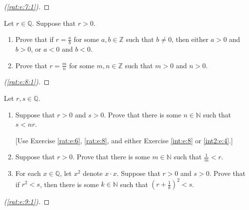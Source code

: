 \begin{proof}[(\ref{rat:e:7:1})]
	\TBD
\end{proof}



\Newpage
\begin{exercise} %
	\label{rat:e:8}
	Let $r \in \mathbb{Q}$. Suppose that $r > 0$.
	\begin{enumerate}
		\item Prove that if $r = \frac{a}{b}$ for some $a, b \in \mathbb{Z}$ such that $b \neq 0$, then either $a > 0$ and $b > 0$, or $a < 0$ and $b < 0$. \label{rat:e:8:1}
		\item Prove that $r = \frac{m}{n}$ for some $m, n \in \mathbb{Z}$ such that $m > 0$ and $n > 0$. \label{rat:e:8:2}
	\end{enumerate}
\end{exercise}

\begin{proof}[(\ref{rat:e:8:1})]
	\TBD
\end{proof}



\Newpage
\begin{exercise} %
	\label{rat:e:9}
	Let $r, s \in \mathbb{Q}$.
	\begin{enumerate}
		\item \label{rat:e:9:1}
		      Suppose that $r > 0$ and $s > 0$. Prove that there is some $n \in \mathbb{N}$ such that $s < n r$.

		      \hfill[Use Exercise \ref{rat:e:6}, \ref{rat:e:8}, and either Exercise \ref{int:e:8} or \ref{int2:e:4}.]
		\item \label{rat:e:9:2}
		      Suppose that $r > 0$. Prove that there is some $m \in \mathbb{N}$ such that $\frac{1}{m} < r$.
		\item \label{rat:e:9:3}
		      For each $x \in \mathbb{Q}$, let $x^{2}$ denote $x \cdot x$. Suppose that $r > 0$ and $s > 0$. Prove that if $r^{2} < s$, then there is some $k \in \mathbb{N}$ such that $\left( r + \frac{1}{k} \right)^{2} < s$.
	\end{enumerate}
\end{exercise}

\begin{proof}[(\ref{rat:e:9:1})]
	\TBD
\end{proof}


